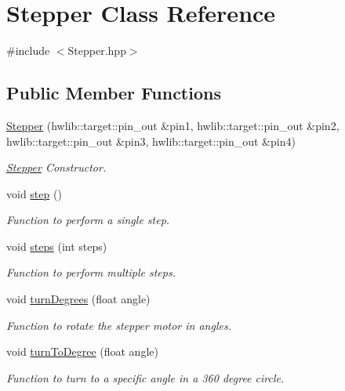 \hypertarget{class_stepper}{}\section{Stepper Class Reference}
\label{class_stepper}


{\ttfamily \#include $<$Stepper.\+hpp$>$}

\subsection*{Public Member Functions}
\begin{DoxyCompactItemize}
\item 
\hyperlink{class_stepper_a83d8d84ea34c97fb66addd0d38ca67ef}{Stepper} (hwlib\+::target\+::pin\+\_\+out \&pin1, hwlib\+::target\+::pin\+\_\+out \&pin2, hwlib\+::target\+::pin\+\_\+out \&pin3, hwlib\+::target\+::pin\+\_\+out \&pin4)
\begin{DoxyCompactList}\small\item\em \hyperlink{class_stepper}{Stepper} Constructor. \end{DoxyCompactList}\item 
\mbox{\label{class_stepper_a0e39951fd27a34356284eaa61acbd3b7}} 
void \hyperlink{class_stepper_a0e39951fd27a34356284eaa61acbd3b7}{step} ()
\begin{DoxyCompactList}\small\item\em Function to perform a single step. \end{DoxyCompactList}\item 
void \hyperlink{class_stepper_a2c8e1dc27b90db4a6f4dbb3f2bce57ae}{steps} (int steps)
\begin{DoxyCompactList}\small\item\em Function to perform multiple steps. \end{DoxyCompactList}\item 
void \hyperlink{class_stepper_a3fd642788644f9f658107644fee29aca}{turn\+Degrees} (float angle)
\begin{DoxyCompactList}\small\item\em Function to rotate the stepper motor in angles. \end{DoxyCompactList}\item 
void \hyperlink{class_stepper_a5fa54ffe303a6cc23d9a89920f648d68}{turn\+To\+Degree} (float angle)
\begin{DoxyCompactList}\small\item\em Function to turn to a specific angle in a 360 degree circle. \end{DoxyCompactList}\item 

\end{DoxyCompactItemize}
